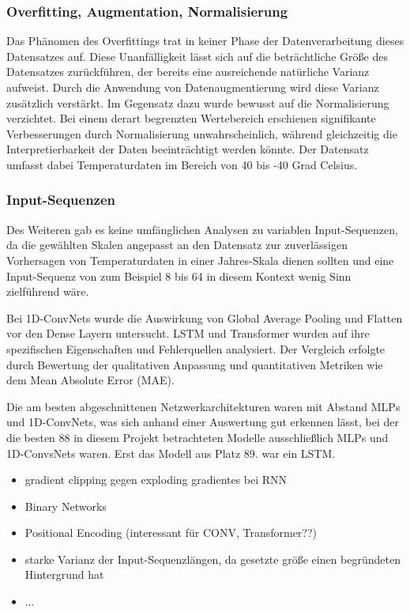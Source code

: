 \documentclass[manuscript,screen,review]{acmart} %
\begin{document}
\subsubsection{Overfitting, Augmentation, Normalisierung} 
Das Phänomen des Overfittings trat in keiner Phase der Datenverarbeitung dieses Datensatzes auf. Diese Unanfälligkeit lässt sich auf die beträchtliche Größe des Datensatzes zurückführen, der bereits eine ausreichende natürliche Varianz aufweist. Durch die Anwendung von Datenaugmentierung wird diese Varianz zusätzlich verstärkt.
Im Gegensatz dazu wurde bewusst auf die Normalisierung verzichtet. Bei einem derart begrenzten Wertebereich erschienen signifikante Verbesserungen durch Normalisierung unwahrscheinlich, während gleichzeitig die Interpretierbarkeit der Daten beeinträchtigt werden könnte. Der Datensatz umfasst dabei Temperaturdaten im Bereich von 40 bis -40 Grad Celsius.
\subsubsection{Input-Sequenzen}
Des Weiteren gab es keine umfänglichen Analysen zu variablen Input-Sequenzen, da die gewählten Skalen angepasst an den Datensatz zur zuverlässigen Vorhersagen von Temperaturdaten in einer Jahres-Skala dienen sollten und eine Input-Sequenz von zum Beispiel 8 bis 64 in diesem Kontext wenig Sinn zielführend wäre.


Bei 1D-ConvNets wurde die Auswirkung von Global Average Pooling und Flatten vor den Dense Layern untersucht. 
LSTM und Transformer wurden auf ihre spezifischen Eigenschaften und Fehlerquellen analysiert. 
Der Vergleich erfolgte durch Bewertung der qualitativen Anpassung und quantitativen Metriken wie dem Mean Absolute Error (MAE).

 Die am besten abgeschnittenen Netzwerkarchitekturen waren mit Abstand MLPs und 1D-ConvNets, was sich anhand einer Auswertung gut erkennen lässt, bei der die besten 88 in diesem Projekt betrachteten Modelle ausschließlich MLPs und 1D-ConvsNets waren. Erst das Modell aus Platz 89. war ein LSTM.

\begin{itemize}
    \item  gradient clipping gegen exploding gradientes bei RNN
    \item Binary Networks
    \item Positional Encoding (interessant für CONV, Transformer??)
    \item starke Varianz der Input-Sequenzlängen, da gesetzte größe einen begründeten Hintergrund hat 
    \item ...
\end{itemize}
\end{document}
